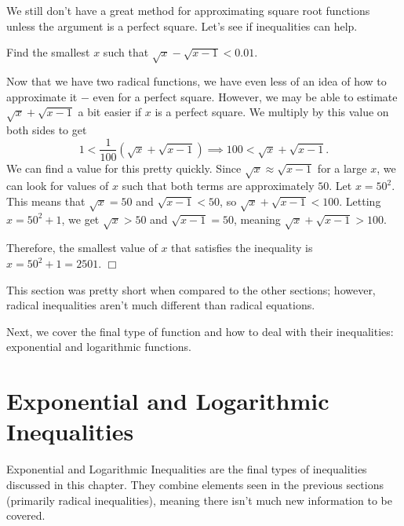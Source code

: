 \documentclass[lang=en,11pt]{elegantbook}
\begin{document}
We still don't have a great method for approximating square root functions unless the argument is a perfect square.  Let's see if inequalities can help.
\begin{example}
Find the smallest $x$ such that $\sqrt{x}-\sqrt{x-1}<0.01$.
\end{example}
\begin{solution}
Now that we have two radical functions, we have even less of an idea of how to approximate it $-$ even for a perfect square.  However, we may be able to estimate $\sqrt{x}+\sqrt{x-1}$ a bit easier if $x$ is a perfect square.  We multiply by this value on both sides to get $$1<\dfrac{1}{100}(\sqrt{x}+\sqrt{x-1}) \implies 100<\sqrt{x}+\sqrt{x-1}.$$
We can find a value for this pretty quickly.  Since $\sqrt{x}\approx\sqrt{x-1}$ for a large $x$, we can look for values of $x$ such that both terms are approximately $50$.  Let $x=50^2$. This means that $\sqrt{x}=50$ and $\sqrt{x-1}<50$, so $\sqrt{x}+\sqrt{x-1}<100$. Letting $x=50^2+1$, we get $\sqrt{x}>50$ and $\sqrt{x-1}=50$, meaning $\sqrt{x}+\sqrt{x-1}>100$.

Therefore, the smallest value of $x$ that satisfies the inequality is $x=50^2+1=2501.$ $\Box$
\end{solution}
This section was pretty short when compared to the other sections; however, radical inequalities aren't much different than radical equations.

Next, we cover the final type of function and how to deal with their inequalities: exponential and logarithmic functions.
\section{Exponential and Logarithmic Inequalities}
\noindent Exponential and Logarithmic Inequalities are the final types of inequalities discussed in this chapter.  They combine elements seen in the previous sections (primarily radical inequalities), meaning there isn't much new information to be covered.
\end{document}
